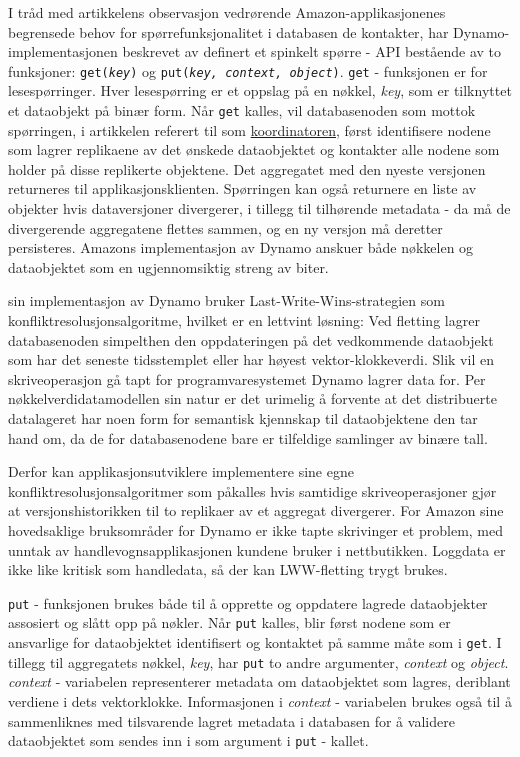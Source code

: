 I tråd med artikkelens observasjon vedrørende Amazon-applikasjonenes begrensede behov for spørrefunksjonalitet i databasen de kontakter, har Dynamo-implementasjonen beskrevet av \cite{decandia2007} definert et spinkelt spørre - API bestående av to funksjoner: \texttt{get(\emph{key})} og \texttt{put(\emph{key, context, object})}. \texttt{get} - funksjonen er for lesespørringer. Hver lesespørring er et oppslag på en nøkkel, \emph{key}, som er tilknyttet et dataobjekt på binær form. Når \texttt{get} kalles, vil databasenoden som mottok spørringen, i artikkelen referert til som \underline{koordinatoren}, først identifisere nodene som lagrer replikaene av det ønskede dataobjektet og kontakter alle nodene som holder på disse replikerte objektene. Det aggregatet med den nyeste versjonen returneres til applikasjonsklienten. Spørringen kan også returnere en liste av objekter hvis dataversjoner divergerer, i tillegg til tilhørende metadata - da må de divergerende aggregatene flettes sammen, og en ny versjon må deretter persisteres. Amazons implementasjon av Dynamo anskuer både nøkkelen og dataobjektet som en ugjennomsiktig streng av biter.

\cite{decandia2007} sin implementasjon av Dynamo bruker Last-Write-Wins-strategien som konfliktresolusjonsalgoritme, hvilket er en lettvint løsning: Ved fletting lagrer databasenoden simpelthen den oppdateringen på det vedkommende dataobjekt som har det seneste tidsstemplet eller har høyest vektor-klokkeverdi. Slik vil en skriveoperasjon gå tapt for programvaresystemet Dynamo lagrer data for. Per nøkkelverdidatamodellen sin natur er det urimelig å forvente at det distribuerte datalageret har noen form for semantisk kjennskap til dataobjektene den tar hand om, da de for databasenodene bare er tilfeldige samlinger av binære tall.

Derfor kan applikasjonsutviklere implementere sine egne konfliktresolusjonsalgoritmer som påkalles hvis samtidige skriveoperasjoner gjør at versjonshistorikken til to replikaer av et aggregat divergerer. For Amazon sine hovedsaklige bruksområder for Dynamo er ikke tapte skrivinger et problem, med unntak av handlevognsapplikasjonen kundene bruker i nettbutikken. Loggdata er ikke like kritisk som handledata, så der kan LWW-fletting trygt brukes.

\texttt{put} - funksjonen brukes både til å opprette og oppdatere lagrede dataobjekter assosiert og slått opp på nøkler. Når \texttt{put} kalles, blir først nodene som er ansvarlige for dataobjektet identifisert og kontaktet på samme måte som i \texttt{get}. I tillegg til aggregatets nøkkel, \emph{key}, har \texttt{put} to andre argumenter, \emph{context} og \emph{object}. \emph{context} - variabelen representerer metadata om dataobjektet som lagres, deriblant verdiene i dets vektorklokke. Informasjonen i \emph{context} - variabelen brukes også til å sammenliknes med tilsvarende lagret metadata i databasen for å validere dataobjektet som sendes inn i som argument i \texttt{put} - kallet.

